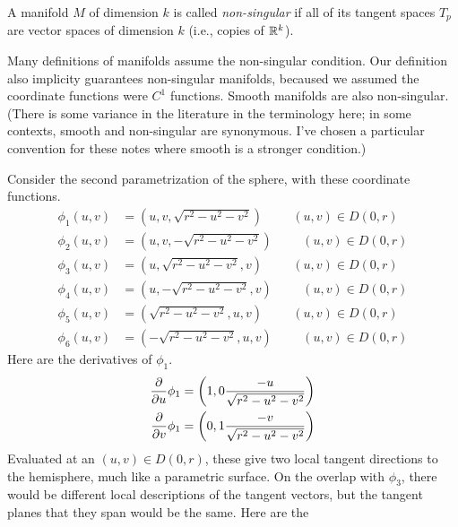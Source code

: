 \documentclass[fleqn,letterpaper]{report}
\begin{document}
\begin{defn}
A manifold $M$ of dimension $k$ is called \emph{non-singular} if all
of its tangent spaces $T_p$ are vector spaces of dimension $k$
(i.e., copies of $\mathbb{R}^k$). 
\end{defn}

Many definitions of manifolds assume the non-singular condition.
Our definition also implicity guarantees non-singular manifolds,
becaused we assumed the coordinate functions were $C^1$
functions. Smooth manifolds are also non-singular. 
(There is some variance in the literature in the terminology
here; in some contexts, smooth and non-singular are
synonymous. I've chosen a particular convention for these
notes where smooth is a stronger condition.) 

\begin{example}
Consider the second parametrization of the sphere, with these
coordinate functions.
\begin{align*}
\phi_1(u,v) & = \left(u,v,\sqrt{r^2-u^2-v^2} \right) \hspace{1cm}
(u,v) \in D(0,r) \\
\phi_2(u,v) & = \left(u,v,-\sqrt{r^2-u^2-v^2} \right) \hspace{1cm}
(u,v) \in D(0,r) \\
\phi_3(u,v) & = \left(u,\sqrt{r^2-u^2-v^2},v \right) \hspace{1cm}
(u,v) \in D(0,r) \\
\phi_4(u,v) & = \left(u,-\sqrt{r^2-u^2-v^2},v \right) \hspace{1cm}
(u,v) \in D(0,r) \\
\phi_5(u,v) & = \left(\sqrt{r^2-u^2-v^2},u,v \right) \hspace{1cm}
(u,v) \in D(0,r) \\
\phi_6(u,v) & = \left(-\sqrt{r^2-u^2-v^2},u,v \right) \hspace{1cm}
(u,v) \in D(0,r) 
\end{align*}
Here are the derivatives of $\phi_1$. 
\begin{align*}
\frac{\partial}{\partial u} \phi_1 & = \left(1,0
\frac{-u}{\sqrt{r^2-u^2-v^2}} \right) \\
\frac{\partial}{\partial v} \phi_1 & = \left(0,1
\frac{-v}{\sqrt{r^2-u^2-v^2}} \right) 
\end{align*}
Evaluated at an $(u,v) \in D(0,r)$, these give two local
tangent directions to the hemisphere, much like a parametric
surface. On the overlap with $\phi_3$, there would be
different local descriptions of the tangent vectors, but the
tangent planes that they span would be the same. Here are the

\end{example}
\end{document}
